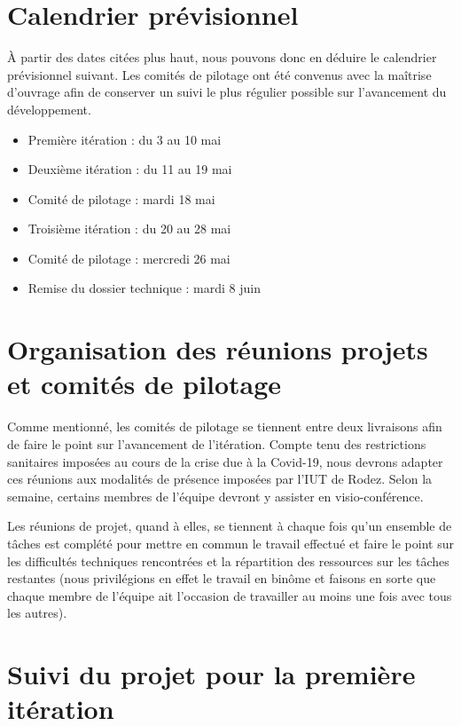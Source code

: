 \documentclass[12pt,a4paper,titlepage,openany, oneside]{report}
\begin{document}
    \section{Calendrier prévisionnel}
        \`{A} partir des dates citées plus haut, nous pouvons donc en déduire le
        calendrier prévisionnel suivant. Les comités de pilotage ont été convenus avec
        la maîtrise d'ouvrage afin de conserver un suivi le plus régulier possible sur
        l'avancement du développement.
        \begin{itemize}
            \item Première itération : du 3 au 10 mai
            \item Deuxième itération : du 11 au 19 mai
            \item Comité de pilotage : mardi 18 mai
            \item Troisième itération : du 20 au 28 mai
            \item Comité de pilotage : mercredi 26 mai
            \item Remise du dossier technique : mardi 8 juin
        \end{itemize}

    \section{Organisation des réunions projets et comités de pilotage}
        Comme mentionné, les comités de pilotage se tiennent entre deux livraisons
        afin de faire le point sur l'avancement de l'itération. Compte tenu des restrictions
        sanitaires imposées au cours de la crise due à la Covid-19, nous devrons adapter
        ces réunions aux modalités de présence imposées par l'IUT de Rodez. Selon la
        semaine, certains membres de l'équipe devront y assister en visio-conférence.

        Les réunions de projet, quand à elles, se tiennent à chaque fois qu'un ensemble de
        tâches est complété pour mettre en commun le travail effectué et faire le point sur
        les difficultés techniques rencontrées et la répartition des ressources sur les
        tâches restantes (nous privilégions en effet le travail en binôme et faisons en
        sorte que chaque membre de l'équipe ait l'occasion de travailler au moins une fois
        avec tous les autres).

    \section{Suivi du projet pour la première itération}
\end{document}
